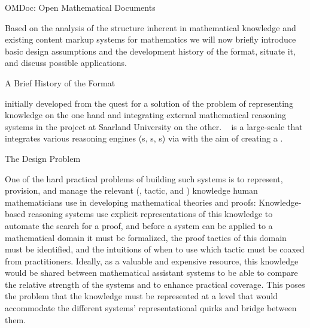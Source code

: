 
\begin{omgroup}[id=omdoc-markup,short=Open Mathematical Documents]
                           {OMDoc: Open Mathematical Documents}

  Based on the analysis of the structure inherent in mathematical knowledge and existing
  content markup systems for mathematics we will now briefly introduce basic design
  assumptions and the development history of the {\omdoc} format, situate it, and discuss
  possible applications.

\begin{omgroup}[id=omdoc-history]{A Brief History of the {\omdoc} Format}

  {\omdoc} initially developed from the quest for a solution of the problem of
  representing knowledge on the one hand and integrating external mathematical reasoning
  systems in the {\OMEGA} project at Saarland University on the
  other. {\OMEGA}~\cite{OMEGA02} is a large-scale
  {} that integrates various reasoning engines
  ({s}, {s},
  {s}) via {}
  with the aim of creating a {}.

\begin{omgroup}[id=situating]{The Design Problem}
  
  One of the hard practical problems of building such systems is to represent, provision,
  and manage the relevant (, tactic, and
  ) knowledge human mathematicians use in
  developing mathematical theories and proofs: Knowledge-based reasoning systems use
  explicit representations of this knowledge to automate the search for a proof, and
  before a system can be applied to a mathematical domain it must be formalized, the proof
  tactics of this domain must be identified, and the intuitions of when to use which
  tactic must be coaxed from practitioners. Ideally, as a valuable and expensive resource,
  this knowledge would be shared between mathematical assistant systems to be able to
  compare the relative strength of the systems and to enhance practical coverage. This
  poses the problem that the knowledge must be represented at a level that would
  accommodate the different systems' representational quirks and bridge between them.


\end{omgroup}
\end{omgroup}
\end{omgroup}
